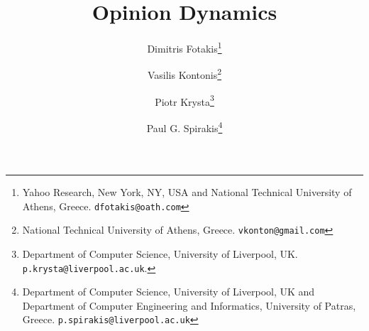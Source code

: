 \documentclass[11pt,letterpaper]{article}
\title{Opinion Dynamics}
\author{
Dimitris Fotakis\thanks{Yahoo Research, New York, NY, USA and National Technical University of Athens, Greece. {\tt dfotakis@oath.com}}
\and Vasilis Kontonis\thanks{National Technical University of Athens, Greece. {\tt vkonton@gmail.com}}
\and Piotr Krysta\thanks{Department of Computer Science, University of Liverpool, UK. {\tt p.krysta@liverpool.ac.uk}.}
\and Paul G. Spirakis\thanks{Department of Computer Science, University of Liverpool, UK and
  Department of Computer Engineering and Informatics, University of Patras, Greece. {\tt p.spirakis@liverpool.ac.uk}}
}
\begin{document}
\maketitle

\begin{abstract}
  
\end{abstract}

\setcounter{page}{0}
\thispagestyle{empty}
\newpage

\pagestyle{plain}








\appendix\makeatletter
\edef\thetheorem{\expandafter\noexpand\thesection\@thmcountersep\@thmcounter{theorem}}
\makeatother
\end{document}
